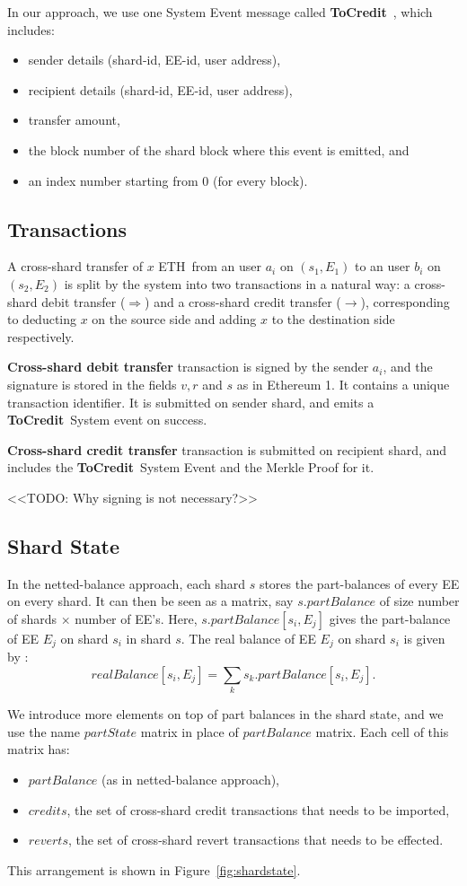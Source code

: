 \documentclass{article}
\newcommand{\eth}[0]{ETH~}
\newcommand{\tocredit}[0]{{\bf ToCredit}~}
\begin{document}
In our approach, we use one System Event message called \tocredit, which includes:
\begin{itemize}
\item sender details (shard-id, EE-id, user address), 
\item recipient details (shard-id, EE-id, user address), 
\item transfer amount, 
\item the block number of the shard block where this event is emitted, and 
\item an index number starting from 0 (for every block).
\end{itemize}

\subsection{Transactions}

A cross-shard transfer of $x$ \eth from an user $a_i$ on $(s_1,E_1)$ to an user $b_i$ on $(s_2,E_2)$ is split by the system into two transactions in a natural way: a cross-shard debit transfer ($\Longrightarrow$) and a cross-shard credit transfer ($\longrightarrow$), corresponding to deducting $x$ on the source side and adding $x$ to the destination side respectively. 

{\bf Cross-shard debit transfer} transaction is signed by the sender $a_i$, and the signature is stored in the fields $v, r$ and $s$ as in Ethereum 1. It contains a unique transaction identifier. It is submitted on sender shard, and emits a \tocredit System event on success.

{\bf Cross-shard credit transfer} transaction is submitted on recipient shard, and includes the \tocredit System Event and the Merkle Proof for it.

<<TODO: Why signing is not necessary?>>

\subsection{Shard State}
In the netted-balance approach, each shard $s$ stores the part-balances of every EE on every shard. It can then be seen as a matrix, say $s.partBalance$ of size number of shards $\times$ number of EE's. Here, $s.partBalance[s_i,E_j]$ gives the part-balance of EE $E_j$ on shard $s_i$ in shard $s$. The real balance of EE $E_j$ on shard $s_i$ is given by : 
\[
	realBalance[s_i,E_j] = \sum_k s_k.partBalance[s_i,E_j].
\]

We introduce more elements on top of part balances in the shard state, and we use the name $partState$ matrix in place of $partBalance$ matrix. Each cell of this matrix has:
\begin{itemize}
	\item $partBalance$ (as in netted-balance approach),
	\item $credits$, the set of cross-shard credit transactions that needs to be imported,
	\item $reverts$, the set of cross-shard revert transactions that needs to be effected.
\end{itemize}
This arrangement is shown in Figure~\ref{fig:shardstate}.
\end{document}
